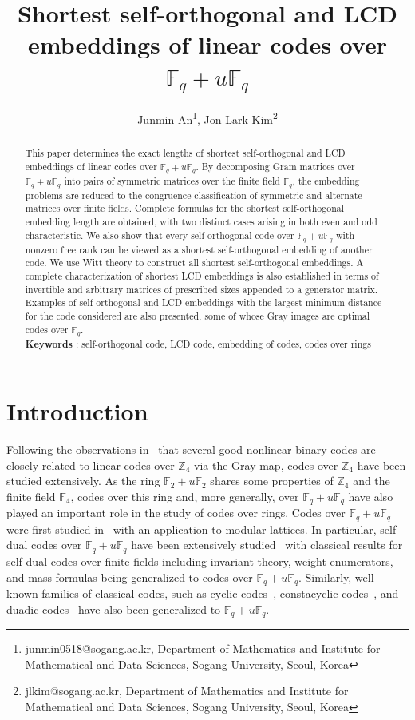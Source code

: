 \documentclass{article}
\title{Shortest self-orthogonal and LCD embeddings of linear codes over $\mathbb{F}_q+u\mathbb{F}_q$}
\author{Junmin An\thanks{junmin0518@sogang.ac.kr, Department of Mathematics and Institute for Mathematical and Data Sciences, Sogang University, Seoul, Korea}, Jon-Lark Kim\thanks{jlkim@sogang.ac.kr, Department of Mathematics and Institute for Mathematical and Data Sciences, Sogang University, Seoul, Korea}}
\date{}
\theoremstyle{definition}
\theoremstyle{remark}
\begin{document}
\maketitle

\begin{abstract}
This paper determines the exact lengths of shortest self-orthogonal and LCD embeddings of linear codes over $\mathbb{F}_q+u\mathbb{F}_q$. By decomposing Gram matrices over $\mathbb{F}_q+u\mathbb{F}_q$ into pairs of symmetric matrices over the finite field $\mathbb{F}_q$, the embedding problems are reduced to the congruence classification of symmetric and alternate matrices over finite fields. Complete formulas for the shortest self-orthogonal embedding length are obtained, with two distinct cases arising in both even and odd characteristic. We also show that every self-orthogonal code over $\mathbb{F}_q+u\mathbb{F}_q$ with nonzero free rank can be viewed as a shortest self-orthogonal embedding of another code. We use Witt theory to construct all shortest self-orthogonal embeddings. A complete characterization of shortest LCD embeddings is also established in terms of invertible and arbitrary matrices of prescribed sizes appended to a generator matrix. Examples of self-orthogonal and LCD embeddings with the largest minimum distance for the code considered are also presented, some of whose Gray images are optimal codes over $\mathbb{F}_q$.\\

\textbf{Keywords} : self-orthogonal code, LCD code, embedding of codes, codes over rings
\end{abstract}


\section{Introduction}
Following the observations in~\cite{FST-1992,HKCSS-1994} that several good nonlinear binary codes are closely related to linear codes over $\mathbb Z_4$ via the Gray map, codes over $\mathbb Z_4$ have been studied extensively. As the ring $\mathbb{F}_2+u\mathbb{F}_2$ shares some properties of $\mathbb{Z}_4$ and the finite field $\mathbb{F}_4$, codes over this ring and, more generally, over $\mathbb{F}_q+u\mathbb{F}_q$ have also played an important role in the study of codes over rings. Codes over $\mathbb{F}_q+u\mathbb{F}_q$ were first studied in~\cite{B-1997} with an application to modular lattices. In particular, self-dual codes over $\mathbb{F}_q+u\mathbb{F}_q$ have been extensively studied~\cite{BU-1999,DGHMS-1999,DGHS-1999,G-1996,H-2007} with classical results for self-dual codes over finite fields including invariant theory, weight enumerators, and mass formulas being generalized to codes over $\mathbb{F}_q+u\mathbb{F}_q$. Similarly, well-known families of classical codes, such as cyclic codes~\cite{AS-2007,BU-1999,UB-1999}, constacyclic codes~\cite{D-2009,D-2010,DNSS-2018,DNSY-2021}, and duadic codes~\cite{L-2001} have also been generalized to $\mathbb{F}_q+u\mathbb{F}_q$.
\end{document}
